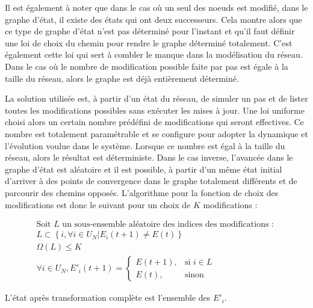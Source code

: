 \documentclass[11pt, a4paper]{article}
\begin{document}
Il est également à noter que dans le cas où un seul des noeuds est modifié,
dans le graphe d'état, il existe des états qui ont deux successeurs. Cela
montre alors que ce type de graphe d'état n'est pas déterminé pour l'instant et
qu'il faut définir une loi de choix du chemin pour rendre le graphe déterminé
totalement. C'est également cette loi qui sert à combler le manque dans la
modélisation du réseau. Dans le cas où le nombre de modification possible faite
par pas est égale à la taille du réseau, alors le graphe est déjà entièrement
déterminé.

La solution utilisée est, à partir d'un état du réseau, de simuler un pas et de
lister toutes les modifications possibles sans ex\'ecuter les mises à jour. Une loi uniforme choisi alors un
certain nombre prédéfini de modifications qui seront effectives. Ce nombre est
totalement paramétrable et se configure pour adopter la dynamique et
l'évolution voulue dans le système. Lorsque ce nombre est égal à la taille du
réseau, alors le résultat est déterministe. Dans le cas inverse, l'avancée dans
le graphe d'état est aléatoire et il est possible, à partir d'un même état
initial d'arriver à des points de convergence dans le graphe totalement
différents et de parcourir des chemins opposés. L'algorithme pour la fonction
de choix des modifications est donc le suivant pour un choix de $K$
modifications :

\begin{multline}
    \mbox{Soit } L \mbox{ un sous-ensemble aléatoire des indices des
    modifications : } \\
    L \subset \left\{i, \forall i \in U_N | E_i(t + 1) \ne E(t)\right\} \\
    \Omega(L) \le K \\
    \forall i \in U_N, E'_i(t + 1) = \left\{\begin{array}{rl}
        E(t + 1), & \mbox{si } i \in L \\
        E(t), & \mbox{sinon}
    \end{array}\right.
\end{multline}

L'état après transformation complète est l'ensemble des $E'_i$. \\
\end{document}
